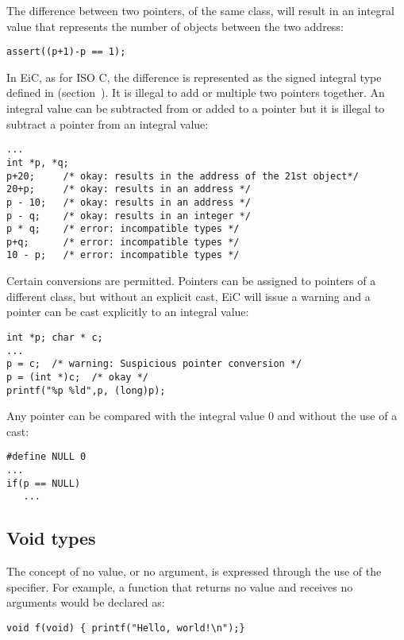 The difference between two pointers, of the same class, will result in
an integral value that represents the number of objects between the
two address:
\begin{production}
\begin{verbatim}
assert((p+1)-p == 1);
\end{verbatim}
\end{production}
 In EiC, as for ISO C, the difference is represented as the signed
integral type  defined in 
(section~). It is illegal to add or multiple two
pointers together. An integral value can be subtracted from or added
to a pointer but it is illegal to subtract a pointer from an integral
value:
\begin{production} 
\begin{verbatim}
...
int *p, *q;
p+20;     /* okay: results in the address of the 21st object*/
20+p;     /* okay: results in an address */
p - 10;   /* okay: results in an address */
p - q;    /* okay: results in an integer */
p * q;    /* error: incompatible types */
p+q;      /* error: incompatible types */
10 - p;   /* error: incompatible types */
\end{verbatim}
\end{production}
 Certain conversions are permitted. Pointers can be assigned to pointers
of a different class, but without an explicit cast, EiC will issue a
warning and a pointer can be cast explicitly to an integral
value:
\begin{production}
\begin{verbatim}
int *p; char * c;
...
p = c;  /* warning: Suspicious pointer conversion */
p = (int *)c;  /* okay */
printf("%p %ld",p, (long)p);  
\end{verbatim}
\end{production}

Any pointer can be compared with the integral value
0 and without the use of a cast:
\begin{production}
\begin{verbatim}
#define NULL 0
...
if(p == NULL)
   ...
\end{verbatim}
\end{production}

\subsection{Void types}
\label{sec:void}

The concept of no value, or no argument, is expressed through the use
of the  specifier. For example, a function that returns no
value and receives no arguments would be declared as:
\begin{production}
\begin{verbatim}
void f(void) { printf("Hello, world!\n");}
\end{verbatim}
\end{production}


